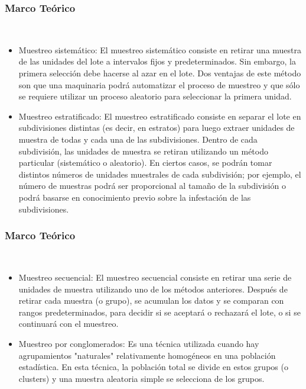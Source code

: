 \documentclass[11pt]{beamer}
\begin{document}
\begin{frame}
\frametitle{Marco Teórico}
\begin{itemize}
~\\
\begin{itemize}
\item Muestreo sistemático: El muestreo sistemático consiste en retirar una muestra de las unidades del lote a intervalos fijos y predeterminados. Sin
embargo, la primera selección debe hacerse al azar en el lote. Dos ventajas de este método son que una maquinaria podrá automatizar el proceso de muestreo y que sólo se requiere utilizar un proceso aleatorio para seleccionar la primera unidad.
\item Muestreo estratificado: El muestreo estratificado consiste en separar el lote en subdivisiones distintas (es decir, en estratos) para luego extraer
unidades de muestra de todas y cada una de las subdivisiones. Dentro de cada subdivisión, las unidades de muestra se
retiran utilizando un método particular (sistemático o aleatorio). En ciertos casos, se podrán tomar distintos números de
unidades muestrales de cada subdivisión; por ejemplo, el número de muestras podrá ser proporcional al tamaño de la
subdivisión o podrá basarse en conocimiento previo sobre la infestación de las subdivisiones.
\end{itemize}
\end{itemize}
\end{frame}

\begin{frame}
\frametitle{Marco Teórico}
\begin{itemize}
~\\
\begin{itemize}
\item Muestreo secuencial: El muestreo secuencial consiste en retirar una serie de unidades de muestra utilizando uno de los métodos anteriores. Después de retirar cada muestra (o grupo), se acumulan los datos y se comparan con rangos predeterminados, para decidir si se aceptará o rechazará el lote, o si se continuará con el muestreo.
\item Muestreo por conglomerados: Es una técnica utilizada cuando hay agrupamientos "naturales" relativamente homogéneos en una población estadística. En esta técnica, la población total se divide en estos grupos (o clusters) y una muestra aleatoria simple se selecciona de los grupos.
\end{itemize}
\end{itemize}
\end{frame}
\end{document}
